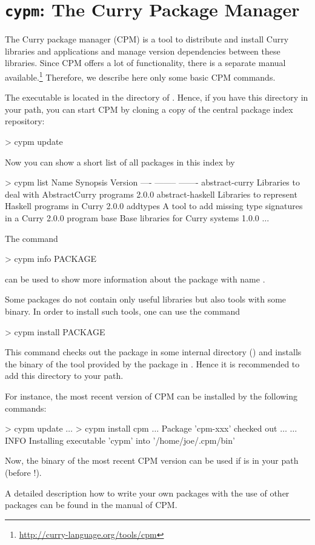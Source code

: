 \section{\texttt{cypm}: The Curry Package Manager}
\label{sec-cpm}

The Curry package manager (CPM) is a tool to
distribute and install Curry libraries and applications
and manage version dependencies between these libraries.
Since CPM offers a lot of functionality, there is a separate
manual available.\footnote{\url{http://curry-language.org/tools/cpm}}
Therefore, we describe here only some basic CPM commands.

The executable  is located in the  directory
of \CYS. Hence, if you have this directory in your path,
you can start CPM by cloning a copy of the central package index repository:
%
\begin{curry}
> cypm update
\end{curry}
%
Now you can show a short list of all packages in this index by
%
\begin{curry}
> cypm list
Name               Synopsis                                           Version   
----               --------                                           -------   
abstract-curry     Libraries to deal with AbstractCurry programs      2.0.0     
abstract-haskell   Libraries to represent Haskell programs in Curry   2.0.0     
addtypes           A tool to add missing type signatures in a Curry   2.0.0     
                   program                                           
base               Base libraries for Curry systems                   1.0.0     
$\ldots$
\end{curry}
%
The command
%
\begin{curry}
> cypm info PACKAGE
\end{curry}
%
can be used to show more information about the package with name
.

Some packages do not contain only useful libraries
but also tools with some binary. In order to install such tools,
one can use the command
%
\begin{curry}
> cypm install PACKAGE
\end{curry}
%
This command checks out the package in some internal directory
()
and installs the binary of the tool provided by the package
in .
Hence it is recommended to add this directory to your path.

For instance, the most recent version of CPM
can be installed by the following commands:
%
\begin{curry}
> cypm update
$\ldots$
> cypm install cpm
$\ldots$ Package 'cpm-xxx' checked out $\ldots$
$\ldots$
INFO  Installing executable 'cypm' into '/home/joe/.cpm/bin'
\end{curry}
%
Now, the binary  of the most recent CPM version can be used
if  is in your path
(before !).

A detailed description how to write your own packages
with the use of other packages can be found in the manual of CPM.

